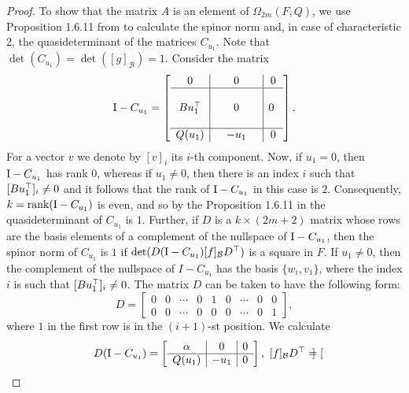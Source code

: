 \begin{proof}
    To show that the matrix $A$ is an element of $\Omega_{2m}(F,Q)$,
    we use Proposition 1.6.11 from \cite{BrayHoltRD} to calculate the spinor 
    norm and, in case of characteristic $2$, the quasideterminant of the
    matrices $C_{u_1}$. Note that $\det(C_{u_1}) = \det([g]_{\mathcal{B}}) = 1$.
    Consider the matrix
    \begin{equation*}
	\mathord{\mathrm{I}}-C_{u_1} = \left[
	    \begin{array}{c|c|c}
		0 & 0 & 0  \\ \hline 
		 & & \\
		Bu_1^\top &\ \ \ \ \ 0\ \ \ \ \  & 0\  \\ 
		 & & \\ \hline 
		Q(u_1) & -u_1 & 0
	    \end{array}
	\right].
    \end{equation*}
    For a vector $v$ we denote by $[v]_i$ its $i$-th component. Now, 
    if $u_1 = 0$, then $\mathord{\mathrm{I}}-C_{u_1}$ has rank $0$, whereas if $u_1 \neq 0$, then
    there is an index $i$ such that $[Bu_1^\top]_i \neq 0$ and it follows that
    the rank of $\mathord{\mathrm{I}}-C_{u_1}$ in this case is $2$. Consequently, $k=\operatorname{rank}(\mathord{\mathrm{I}}-C_{u_1})$ is
    even, and so by the Proposition 1.6.11 in \cite{BrayHoltRD} the quasideterminant of $C_{u_1}$
    is $1$. Further, if $D$ is a $k\times (2m+2)$ matrix whose rows are the basis
    elements of a complement of the nullspace of $\mathord{\mathrm{I}}-C_{u_1}$, then the spinor norm of
     $C_{u_1}$ is $1$
    if $\det(D(\mathord{\mathrm{I}}-C_{u_1}) [f]_{\mathcal{B}} D^\top)$ is a square in $F$. If $u_1 \neq 0$,
    then the complement of the nullspace of $I-C_{u_1}$ has the basis
    $\{ w_i, v_1 \}$, where the index $i$ is such that $[Bu_1^\top]_i \neq 0$. 
    The matrix $D$ can be taken to have the following form:
    \begin{equation*}
	D = \begin{bmatrix}
	    0 & 0 & \cdots & 0 & 1 & 0 & \cdots & 0 & 0 \\
	    0 & 0 & \cdots & 0 & 0 & 0 & \cdots & 0 & 1
	\end{bmatrix},
    \end{equation*}
    where $1$ in the first row is in the $(i+1)$-st position. We calculate
    \begin{equation*}
	D(\II-C_{u_1}) = \left[
	    \begin{array}{c|c|c}
		\alpha & 0 & 0 \\ \hline
		Q(u_1) & -u_1 & 0
	    \end{array}
	\right],\ 
	[f]_{\mathcal{B}} D^\T = \begin{bmatrix}

\end{bmatrix}
\end{equation*}
\end{proof}
